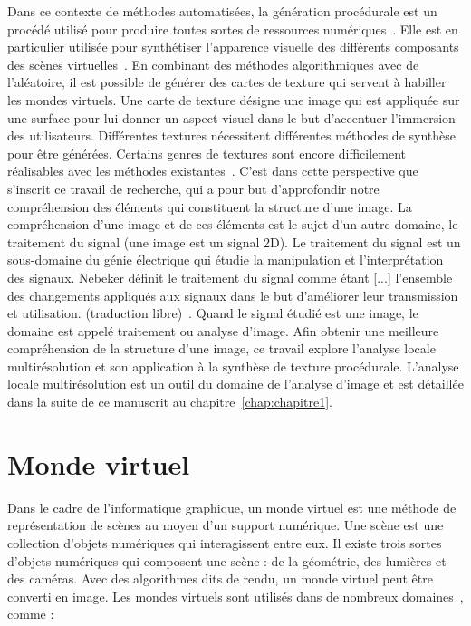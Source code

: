 
Dans ce contexte de méthodes automatisées, la génération procédurale est un procédé utilisé pour produire toutes sortes de ressources numériques~\cite{smelik_survey_2014}. Elle est en particulier utilisée pour synthétiser l'apparence visuelle des différents composants des scènes virtuelles~\cite{alessio_procedural_2021}. En combinant des méthodes algorithmiques avec de l'aléatoire, il est possible de générer des cartes de texture qui servent à habiller les mondes virtuels. Une carte de texture désigne une image qui est appliquée sur une surface pour lui donner un aspect visuel dans le but d'accentuer l'immersion des utilisateurs. Différentes textures nécessitent différentes méthodes de synthèse pour être générées. Certains genres de textures sont encore difficilement réalisables avec les méthodes existantes~\cite{lutz_cyclostationary-gaussian_2021}. C'est dans cette perspective que s'inscrit ce travail de recherche, qui a pour but d'approfondir notre compréhension des éléments qui constituent la structure d'une image. La compréhension d'une image et de ces éléments est le sujet d'un autre domaine, le traitement du signal (une image est un signal 2D). Le traitement du signal est un sous-domaine du génie électrique qui étudie la manipulation et l'interprétation des signaux. Nebeker définit le traitement du signal comme étant [...] l'ensemble des changements appliqués aux signaux dans le but d'améliorer leur transmission et utilisation. (traduction libre)~\cite{nebeker_fifty_1998}. Quand le signal étudié est une image, le domaine est appelé traitement ou analyse d'image. Afin obtenir une meilleure compréhension de la structure d'une image, ce travail explore l'analyse locale multirésolution et son application à la synthèse de texture procédurale. L'analyse locale multirésolution est un outil du domaine de l'analyse d'image et est détaillée dans la suite de ce manuscrit au chapitre~\ref{chap:chapitre1}.

\section{Monde virtuel}

Dans le cadre de l'informatique graphique, un monde virtuel est une méthode de représentation de scènes au moyen d'un support numérique. Une scène est une collection d'objets numériques qui interagissent entre eux. Il existe trois sortes d'objets numériques qui composent une scène : de la géométrie, des lumières et des caméras. Avec des algorithmes dits de rendu, un monde virtuel peut être converti en image. Les mondes virtuels sont utilisés dans de nombreux domaines~\cite{magnenat-thalmann_introduction_1986}, comme :

